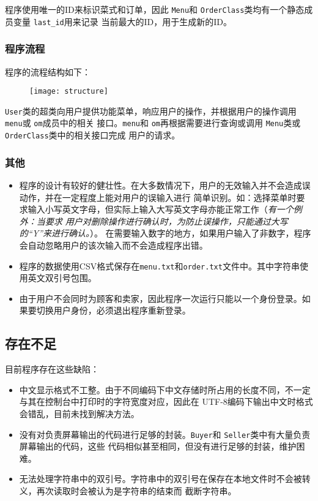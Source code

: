 \documentclass[adobefonts,a4paper]{ctexart}
\begin{document}
程序使用唯一的ID来标识菜式和订单，因此 \verb|Menu|和 \verb|OrderClass|类均有一个静态成员变量
\verb|last_id|用来记录
当前最大的ID，用于生成新的ID。


\subsubsection{程序流程}

程序的流程结构如下：

\begin{figure}[htbp]
\texttt{[image: structure]}
\end{figure}

\verb|User|类的超类向用户提供功能菜单，响应用户的操作，并根据用户的操作调用 \verb|menu|或 \verb|om|成员中的相关
接口。\verb|menu|和 \verb|om|再根据需要进行查询或调用 \verb|Menu|类或 \verb|OrderClass|类中的相关接口完成
用户的请求。

\subsubsection{其他}
\begin{itemize}
 \item 程序的设计有较好的健壮性。在大多数情况下，用户的无效输入并不会造成误动作，并在一定程度上能对用户的误输入进行
 简单识别。如：选择菜单时要求输入小写英文字母，但实际上输入大写英文字母亦能正常工作（\emph{有一个例外：当要求
 用户对删除操作进行确认时，为防止误操作，只能通过大写的``Y''来进行确认。}）。
 在需要输入数字的地方，如果用户输入了非数字，程序会自动忽略用户的该次输入而不会造成程序出错。
 
 \item 程序的数据使用CSV格式保存在\verb|menu.txt|和\verb|order.txt|文件中。其中字符串使用英文双引号包围。
 
 \item 由于用户不会同时为顾客和卖家，因此程序一次运行只能以一个身份登录。如果要切换用户身份，必须退出程序重新登录。
\end{itemize}


\subsection{存在不足}
目前程序存在这些缺陷：
\begin{itemize}
 \item 中文显示格式不工整。由于不同编码下中文存储时所占用的长度不同，不一定与其在控制台中打印时的字符宽度对应，因此在
 UTF-8编码下输出中文时格式会错乱，目前未找到解决方法。
 
 \item 没有对负责屏幕输出的代码进行足够的封装。\verb|Buyer|和 \verb|Seller|类中有大量负责屏幕输出的代码，这些
 代码相似甚至相同，但没有进行足够的封装，维护困难。
 
 \item 无法处理字符串中的双引号。字符串中的双引号在保存在本地文件时不会被转义，再次读取时会被认为是字符串的结束而
 截断字符串。
 
\end{itemize}
\end{document}
